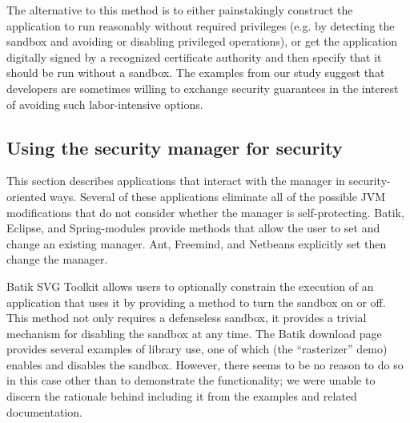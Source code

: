 \documentclass{sig-alternate}
\begin{document}
The alternative to this method is to either painstakingly
construct the application to run reasonably without required privileges (e.g. by
detecting the sandbox and avoiding or disabling privileged operations), or get
the application digitally signed by a recognized certificate authority and
then specify that it should be run without a sandbox.  The examples from our study suggest that
developers are sometimes willing to exchange security guarantees in the interest
of avoiding such labor-intensive options.

\subsection{Using the security manager for security}
\label{sub:Using-the-Security}

This section describes applications that interact with the manager in
security-oriented ways.  Several of these applications eliminate all of the possible
JVM modifications that do not consider whether the manager is self-protecting.  Batik,
Eclipse, and Spring-modules provide 
methods that allow the user to set and change an existing manager. 
Ant, Freemind, and Netbeans explicitly set then change the manager.

Batik SVG Toolkit allows users to optionally constrain the execution of an application
that uses it by providing a method to turn the sandbox on or off. 
This method
not only requires a defenseless sandbox, it provides a trivial mechanism for
disabling the sandbox at any time. The Batik download page
provides several examples of library use, one of which (the
``rasterizer'' demo) enables and disables the sandbox.  However, there seems to
be no reason to do so in this case other than to demonstrate the functionality;
we were unable to discern the rationale behind including it from the examples
and related documentation.

\end{document}
